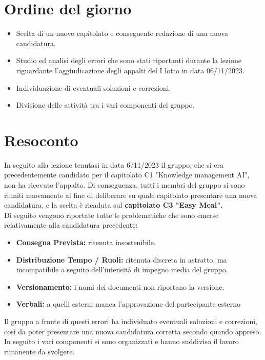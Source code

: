 \section{Ordine del giorno}
\begin{itemize}
	\item Scelta di un nuovo capitolato e conseguente redazione di una nuova candidatura.
	\item Studio ed analisi degli errori che sono stati riportanti durante la lezione riguardante l'aggiudicazione degli appalti del I lotto in data 06/11/2023.
	\item Individuazione di eventuali soluzioni e correzioni.
	\item Divisione delle attività tra i vari componenti del gruppo.
\end{itemize}

\section{Resoconto}
In seguito alla lezione tenutasi in data 6/11/2023 il gruppo, che si era precedentemente candidato per il capitolato C1 "Knowledge management AI", non ha ricevuto l'appalto. Di conseguenza, tutti i membri del gruppo si sono riuniti nuovamente al fine di deliberare su quale capitolato presentare una nuova candidatura, e la scelta è ricaduta sul \textbf{capitolato C3 "Easy Meal".}   \\

\noindent
Di seguito vengono riportate tutte le problematiche che sono emerse relativamente alla candidatura precedente:
\begin{itemize}
	\item \textbf{Consegna Prevista:} ritenuta insostenibile.
	\item \textbf{Distribuzione Tempo / Ruoli:} ritenuta discreta in astratto, ma incompatibile a seguito dell'intensità di impegno media del gruppo.
	\item \textbf{Versionamento:} i nomi dei documenti non riportano la versione.
	\item \textbf{Verbali:} a quelli esterni manca l'approvazione del partecipante esterno
\end{itemize}

\noindent
Il gruppo a fronte di questi errori ha individuato eventuali soluzioni e correzioni, così da poter presentare una nuova candidatura corretta secondo quando appreso.\\
In seguito i vari componenti si sono organizzati e hanno suddiviso il lavoro rimanente da svolgere.

